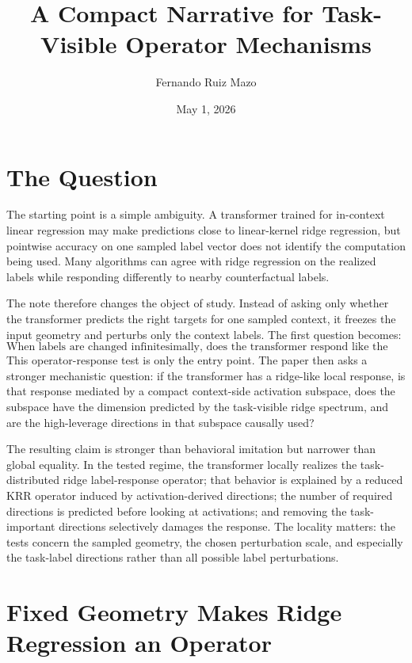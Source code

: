 \documentclass[11pt]{article}
\title{A Compact Narrative for Task-Visible Operator Mechanisms}
\author{Fernando Ruiz Mazo}
\date{May 1, 2026}
\begin{document}
\maketitle

\section{The Question}

The starting point is a simple ambiguity. A transformer trained for in-context linear regression may
make predictions close to linear-kernel ridge regression, but pointwise accuracy on one sampled
label vector does not identify the computation being used. Many algorithms can agree with ridge
regression on the realized labels while responding differently to nearby counterfactual labels.

The note therefore changes the object of study. Instead of asking only whether the transformer
predicts the right targets for one sampled context, it freezes the input geometry and perturbs only
the context labels. The first question becomes:
\[
\text{When labels are changed infinitesimally, does the transformer respond like the ridge operator?}
\]
This operator-response test is only the entry point. The paper then asks a stronger mechanistic
question: if the transformer has a ridge-like local response, is that response mediated by a compact
context-side activation subspace, does the subspace have the dimension predicted by the
task-visible ridge spectrum, and are the high-leverage directions in that subspace causally used?

The resulting claim is stronger than behavioral imitation but narrower than global equality. In the
tested regime, the transformer locally realizes the task-distributed ridge label-response operator;
that behavior is explained by a reduced KRR operator induced by activation-derived directions; the
number of required directions is predicted before looking at activations; and removing the
task-important directions selectively damages the response. The locality matters: the tests concern
the sampled geometry, the chosen perturbation scale, and especially the task-label directions rather
than all possible label perturbations.

\section{Fixed Geometry Makes Ridge Regression an Operator}
\end{document}
